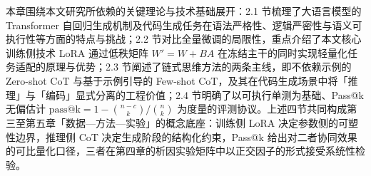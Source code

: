 
本章围绕本文研究所依赖的关键理论与技术基础展开：2.1 节梳理了大语言模型的 Transformer 自回归生成机制及代码生成任务在语法严格性、逻辑严密性与语义可执行性等方面的特点与挑战；2.2 节对比全量微调的局限性，重点介绍了本文核心训练侧技术 LoRA 通过低秩矩阵 $W' = W + BA$ 在冻结主干的同时实现轻量化任务适配的原理与优势；2.3 节阐述了链式思维方法的两条主线，即不依赖示例的 Zero-shot CoT 与基于示例引导的 Few-shot CoT，及其在代码生成场景中将「推理」与「编码」显式分离的工程价值；2.4 节明确了以可执行单测为基础、Pass@k 无偏估计 $\text{pass@k} = 1 - \binom{n-c}{k} / \binom{n}{k}$ 为度量的评测协议。上述四节共同构成第三至第五章「数据—方法—实验」的概念底座：训练侧 LoRA 决定参数侧的可塑性边界，推理侧 CoT 决定生成阶段的结构化约束，Pass@k 给出对二者协同效果的可比量化口径，三者在第四章的析因实验矩阵中以正交因子的形式接受系统性检验。